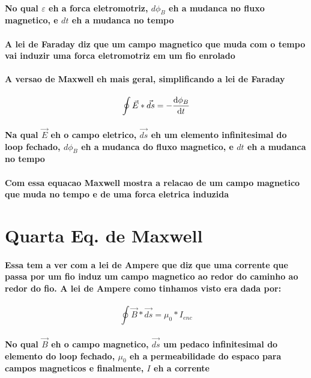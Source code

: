 \documentclass[12pt,twoside, a4paper, twocolumn]{article}
\begin{document}
\paragraph*{No qual $\varepsilon$ eh a forca eletromotriz, $d\phi_B$ eh a mudanca no fluxo magnetico, e $dt$ eh a mudanca no tempo}
\paragraph*{A lei de Faraday diz que um campo magnetico que muda com o tempo vai induzir uma forca eletromotriz em um fio enrolado}
\paragraph*{A versao de Maxwell eh mais geral, simplificando a lei de Faraday}
\begin{equation}
    \oint \vec{E} * \vec{ds} = - \frac{\mathrm d \phi_B}{\mathrm d t}
\end{equation}
\paragraph*{Na qual $\vec{E}$ eh o campo eletrico, $\vec{ds}$ eh um elemento infinitesimal do loop fechado, $d\phi_B$ eh a mudanca do fluxo magnetico, e $dt$ eh a mudanca no tempo}
\paragraph*{Com essa equacao Maxwell mostra a relacao de um campo magnetico que muda no tempo e de uma forca eletrica induzida}

\section{Quarta Eq. de Maxwell}
\paragraph*{Essa tem a ver com a lei de Ampere que diz que uma corrente que passa por um fio induz um campo magnetico ao redor do caminho ao redor do fio. A lei de Ampere como tinhamos visto era dada por:}
\begin{equation}
    \oint \vec{B} * \vec{ds} = \mu_0 * I_{enc}
\end{equation}
\paragraph*{No qual $\vec{B}$ eh o campo magnetico, $\vec{ds}$ um pedaco infinitesimal do elemento do loop fechado, $\mu_0$ eh a permeabilidade do espaco para campos magneticos e finalmente, $I$ eh a corrente}
\end{document}
